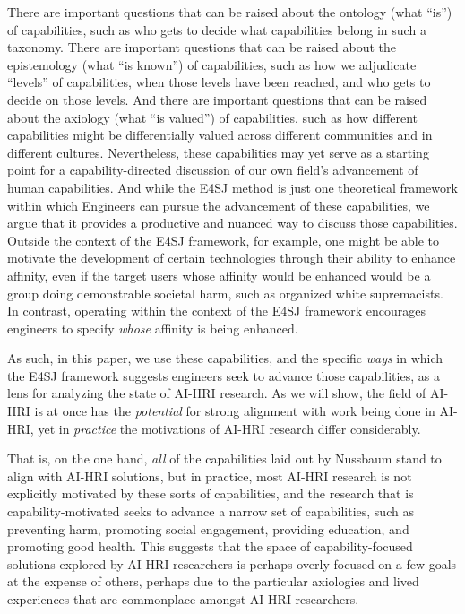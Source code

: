 \documentclass[letterpaper]{article} %
\begin{document}
There are important questions that can be raised about the ontology (what ``is'') of capabilities, such as who gets to decide what capabilities belong in such a taxonomy. 
There are important questions that can be raised about the epistemology (what ``is known'') of capabilities, such as how we adjudicate ``levels'' of capabilities, when those levels have been reached, and who gets to decide on those levels.
And there are important questions that can be raised about the axiology (what ``is valued'') of capabilities, such as how different capabilities might be differentially valued across different communities and in different cultures. Nevertheless, these capabilities may yet serve as a starting point for a capability-directed discussion of our own field's advancement of human capabilities. And while the E4SJ method is just one theoretical framework within which Engineers can pursue the advancement of these capabilities, we argue that it provides a productive and nuanced way to discuss those capabilities. Outside the context of the E4SJ framework, for example, one might be able to motivate the development of certain technologies through their ability to enhance affinity, even if the target users whose affinity would be enhanced would be a group doing demonstrable societal harm, such as organized white supremacists. In contrast, operating within the context of the E4SJ framework encourages engineers to specify \textit{whose} affinity is being enhanced.

As such, in this paper, we use these capabilities, and the specific \textit{ways} in which the E4SJ framework suggests engineers seek to advance those capabilities, as a lens for analyzing the state of AI-HRI research. As we will show, the field of AI-HRI is at once has the \textit{potential} for strong alignment with work being done in AI-HRI, yet in \textit{practice} the motivations of AI-HRI research differ considerably. 

That is, on the one hand, \textit{all} of the capabilities laid out by Nussbaum stand to align with AI-HRI solutions, but in practice, most AI-HRI research is not explicitly motivated by these sorts of capabilities, and the research that is capability-motivated seeks to advance a narrow set of capabilities, such as preventing harm, promoting social engagement, providing education, and promoting good health. This suggests that the space of capability-focused solutions explored by AI-HRI researchers is perhaps overly focused on a few goals at the expense of others, perhaps due to the particular axiologies and lived experiences that are commonplace amongst AI-HRI researchers. 
\end{document}
